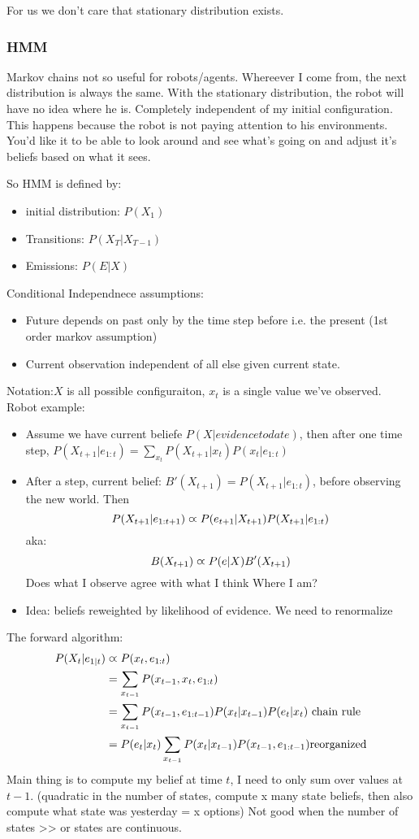 For us we don't care that stationary distribution exists.

\subsubsection{HMM}
Markov chains not so useful for robots/agents. Whereever I come from,
the next distribution is always the same. With the stationary
distribution, the robot will have no idea where he is. Completely
independent of my initial configuration.
This happens because the robot is not paying attention to his
environments. You'd like it to be able to look around and see what's
going on and adjust it's beliefs based on what it sees.

So HMM is defined by:
\begin{itemize}
\item  initial distribution: $P(X_1)$
\item Transitions: $P(X_T|X_{T-1})$
\item Emissions: $P(E|X)$
\end{itemize}
Conditional Independnece assumptions:
\begin{itemize}
\item Future depends on past only by the time step before i.e. the present (1st order
  markov assumption)
\item Current observation independent of all else given current state.
\end{itemize}
Notation:$X$ is all possible configuraiton, $x_t$ is a single value
we've observed.
Robot example:
\begin{itemize}
\item  Assume we have current beliefe $P(X|evidence to date)$,
then after one time step, $P(X_{t+1}|e_{1:t}) = \sum_{x_t}P(X_{t+1}|x_t)P(x_t|e_{1:t})$
\item After a step, current belief: $B'(X_{t+1}) = P(X_{t+1}|e_{1:t})$, before
  observing the new world. Then $$P(X_{t+1}|e_{1:t+1}) \varpropto
  P(e_{t+1}|X_{t+1})P(X_{t+1}|e_{1:t})$$
aka: $$B(X_{t+1})\varpropto P(e|X)B'(X_{t+1})$$
Does what I observe agree with what I think Where I am?
\item Idea: beliefs reweighted by likelihood of evidence. We need to renormalize
\end{itemize}

The forward algorithm:
\begin{align*}
P(X_t|e_{1|t})&\varpropto P(x_t, e_{1:t})  \\
&=\sum_{x_{t-1}}P(x_{t-1}, x_t, e_{1:t})\\
&=\sum_{x_{t-1}}P(x_{t-1}, e_{1:t-1})P(x_t|x_{t-1})P(e_t|x_t) \text{
  chain rule}\\
&= P(e_t|x_t)\sum_{x_{t-1}}P(x_t|x_{t-1})P(x_{t-1}, e_{1:t-1})
\text{reorganized}
\end{align*}
Main thing is to compute my belief at time $t$, I need to only sum
over values at $t-1$. (quadratic in the number of states, compute x
many state beliefs, then also compute what state was yesterday = x options)
Not good when the number of states >> or states are continuous.

